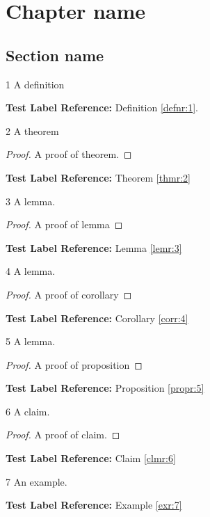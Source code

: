 \documentclass[11pt]{book}
\begin{document}
\chapter{Chapter name}

\section{Section name}

\begin{definition}{}{1}
    A definition
\end{definition}

\textbf{Test Label Reference:} Definition \ref{defnr:1}.

\begin{theorem}{}{2}
    A theorem
\end{theorem}

\begin{proof}
    A proof of theorem.
\end{proof}

\textbf{Test Label Reference:} Theorem \ref{thmr:2}

\begin{lemma}{}{3}
    A lemma.
\end{lemma}

\begin{proof}
    A proof of lemma
\end{proof}

\textbf{Test Label Reference:} Lemma \ref{lemr:3}

\begin{corollary}{}{4}
    A lemma.
\end{corollary}

\begin{proof}
    A proof of corollary
\end{proof}

\textbf{Test Label Reference:} Corollary \ref{corr:4}

\begin{proposition}{}{5}
    A lemma.
\end{proposition}

\begin{proof}
    A proof of proposition
\end{proof}

\textbf{Test Label Reference:} Proposition \ref{propr:5}

\begin{claim}{}{6}
    A claim.
\end{claim}

\begin{proof}
    A proof of claim.
\end{proof}

\textbf{Test Label Reference:} Claim \ref{clmr:6}

\begin{example}{}{7}
    An example.
\end{example}

\textbf{Test Label Reference:} Example \ref{exr:7}
    
\end{document}
